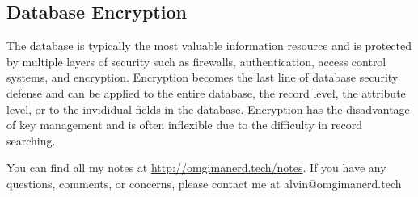 \documentclass{math}
\begin{document}
\subsection*{Database Encryption}
The database is typically the most valuable information resource and is
protected by multiple layers of security such as firewalls, authentication,
access control systems, and encryption. Encryption becomes the last line of
database security defense and can be applied to the entire database, the
record level, the attribute level, or to the invididual fields in the database.
Encryption has the disadvantage of key management and is often inflexible due
to the difficulty in record searching.

\begin{center}
  You can find all my notes at \url{http://omgimanerd.tech/notes}. If you have
  any questions, comments, or concerns, please contact me at
  alvin@omgimanerd.tech
\end{center}
\end{document}
